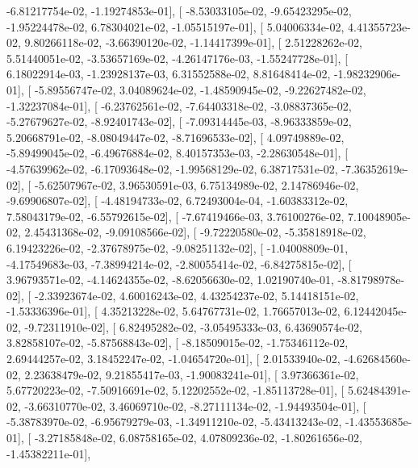 \documentclass{article}
\begin{document}
         -6.81217754e-02,  -1.19274853e-01],
       [ -8.53033105e-02,  -9.65423295e-02,  -1.95224478e-02,
          6.78304021e-02,  -1.05515197e-01],
       [  5.04006334e-02,   4.41355723e-02,   9.80266118e-02,
         -3.66390120e-02,  -1.14417399e-01],
       [  2.51228262e-02,   5.51440051e-02,  -3.53657169e-02,
         -4.26147176e-03,  -1.55247728e-01],
       [  6.18022914e-03,  -1.23928137e-03,   6.31552588e-02,
          8.81648414e-02,  -1.98232906e-01],
       [ -5.89556747e-02,   3.04089624e-02,  -1.48590945e-02,
         -9.22627482e-02,  -1.32237084e-01],
       [ -6.23762561e-02,  -7.64403318e-02,  -3.08837365e-02,
         -5.27679627e-02,  -8.92401743e-02],
       [ -7.09314445e-03,  -8.96333859e-02,   5.20668791e-02,
         -8.08049447e-02,  -8.71696533e-02],
       [  4.09749889e-02,  -5.89499045e-02,  -6.49676884e-02,
          8.40157353e-03,  -2.28630548e-01],
       [ -4.57639962e-02,  -6.17093648e-02,  -1.99568129e-02,
          6.38717531e-02,  -7.36352619e-02],
       [ -5.62507967e-02,   3.96530591e-03,   6.75134989e-02,
          2.14786946e-02,  -9.69906807e-02],
       [ -4.48194733e-02,   6.72493004e-04,  -1.60383312e-02,
          7.58043179e-02,  -6.55792615e-02],
       [ -7.67419466e-03,   3.76100276e-02,   7.10048905e-02,
          2.45431368e-02,  -9.09108566e-02],
       [ -9.72220580e-02,  -5.35818918e-02,   6.19423226e-02,
         -2.37678975e-02,  -9.08251132e-02],
       [ -1.04008809e-01,  -4.17549683e-03,  -7.38994214e-02,
         -2.80055414e-02,  -6.84275815e-02],
       [  3.96793571e-02,  -4.14624355e-02,  -8.62056630e-02,
          1.02190740e-01,  -8.81798978e-02],
       [ -2.33923674e-02,   4.60016243e-02,   4.43254237e-02,
          5.14418151e-02,  -1.53336396e-01],
       [  4.35213228e-02,   5.64767731e-02,   1.76657013e-02,
          6.12442045e-02,  -9.72311910e-02],
       [  6.82495282e-02,  -3.05495333e-03,   6.43690574e-02,
          3.82858107e-02,  -5.87568843e-02],
       [ -8.18509015e-02,  -1.75346112e-02,   2.69444257e-02,
          3.18452247e-02,  -1.04654720e-01],
       [  2.01533940e-02,  -4.62684560e-02,   2.23638479e-02,
          9.21855417e-03,  -1.90083241e-01],
       [  3.97366361e-02,   5.67720223e-02,  -7.50916691e-02,
          5.12202552e-02,  -1.85113728e-01],
       [  5.62484391e-02,  -3.66310770e-02,   3.46069710e-02,
         -8.27111134e-02,  -1.94493504e-01],
       [ -5.38783970e-02,  -6.95679279e-03,  -1.34911210e-02,
         -5.43413243e-02,  -1.43553685e-01],
       [ -3.27185848e-02,   6.08758165e-02,   4.07809236e-02,
         -1.80261656e-02,  -1.45382211e-01],
\end{document}
